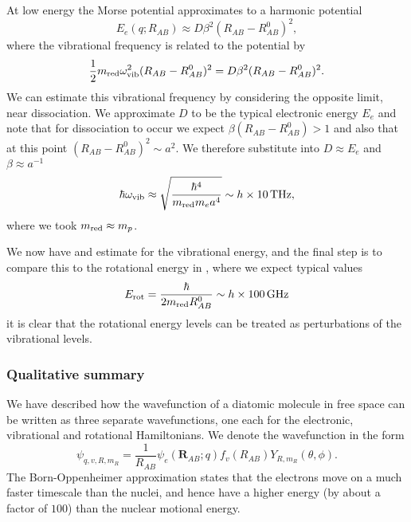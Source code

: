 At low energy the Morse potential approximates
to a harmonic potential
%
\begin{equation}
  E_e(q; R_{AB}) \approx D\beta^2(R_{AB} - R_{AB}^0)^2,
\end{equation}
%
where the vibrational frequency is related to the potential by
%
\begin{equation}
  \frac{1}{2}m_\text{red}{}\omega_\text{vib}^2(R_{AB}-R_{AB}^0)^2 = D\beta^2(R_{AB}-R_{AB}^0)^2.
  \label{theory:eqn:vibfreqrel}
\end{equation}  
%
We can estimate this vibrational frequency by considering the opposite limit,
near dissociation. We approximate $D$ to be the typical electronic energy $E_e$
and note that for dissociation to occur we expect $\beta(R_{AB} - R_{AB}^0) >
1$ and also that at this point $(R_{AB} - R_{AB}^0)^2\sim a^2$. We therefore
substitute into  $D\approx E_e$ and
$\beta\approx a^{-1}$
%
\begin{equation}
  \hbar\omega_\text{vib} \approx \sqrt{\frac{\hbar^4}{\mred{} m_e a^4}} \sim
    h\times\SI{10}{\tera\hertz},
\end{equation}
%
where we took $m_\text{red}{}\approx m_p$.

We now have and estimate for the vibrational energy, and the final step is to
compare this to the rotational energy in , where
we expect typical values
%
\begin{equation}
  E_\text{rot} = \frac{\hbar}{2 m_\text{red}{} R^0_{AB}} \sim h\times\SI{100}{\giga\hertz}
\end{equation}
%
it is clear that the rotational energy levels can be treated as perturbations
of the vibrational levels.

\subsubsection{Qualitative summary}

We have described how the wavefunction of a diatomic molecule in free space can
be written as three separate wavefunctions, one each for the electronic,
vibrational and rotational Hamiltonians. We denote the wavefunction in the form
%
\begin{equation}
  \psi_{q, v, R, m_R} = \frac{1}{R_{AB}}\psi_e(\mathbf{R}_{AB};q)
  f_v(R_{AB})Y_{R, m_R}(\theta, \phi).
\end{equation}
%
The Born-Oppenheimer approximation states that the electrons move on a much
faster timescale than the nuclei, and hence have a higher energy (by about a
factor of $100$) than the nuclear motional energy.

